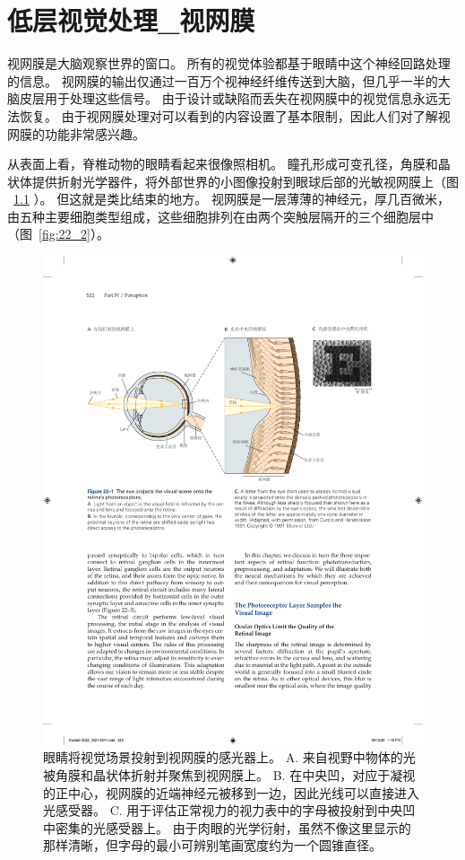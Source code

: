 \chapter{低层视觉处理\_视网膜} \label{chap:chap22}

视网膜是大脑观察世界的窗口。
所有的视觉体验都基于眼睛中这个神经回路处理的信息。 
视网膜的输出仅通过一百万个视神经纤维传送到大脑，但几乎一半的大脑皮层用于处理这些信号。
由于设计或缺陷而丢失在视网膜中的视觉信息永远无法恢复。
由于视网膜处理对可以看到的内容设置了基本限制，因此人们对了解视网膜的功能非常感兴趣。


从表面上看，脊椎动物的眼睛看起来很像照相机。
瞳孔形成可变孔径，角膜和晶状体提供折射光学器件，将外部世界的小图像投射到眼球后部的光敏视网膜上（图 ~\ref{fig:22_1} ）。
但这就是类比结束的地方。
视网膜是一层薄薄的神经元，厚几百微米，由五种主要细胞类型组成，这些细胞排列在由两个突触层隔开的三个细胞层中（图~\ref{fig:22_2}）。


\begin{figure}[htbp]
	\centering
	\includegraphics[width=1.0\linewidth]{chap22/fig_22_1}
	\caption{眼睛将视觉场景投射到视网膜的感光器上。
		A. 来自视野中物体的光被角膜和晶状体折射并聚焦到视网膜上。
		B. 在中央凹，对应于凝视的正中心，视网膜的近端神经元被移到一边，因此光线可以直接进入光感受器。
		C. 用于评估正常视力的视力表中的字母被投射到中央凹中密集的光感受器上。
		由于肉眼的光学衍射，虽然不像这里显示的那样清晰，但字母的最小可辨别笔画宽度约为一个圆锥直径\cite{curcio1991organization}。}
	\label{fig:22_1}
\end{figure}


